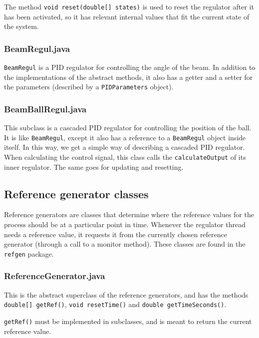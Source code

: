 The method \texttt{void reset(double[] states)} is used to reset the regulator after it has been activated, so it has relevant internal values that fit the current state of the system.

\subsubsection{BeamRegul.java}
\texttt{BeamRegul} is a PID regulator for controlling the angle of the beam. In addition to the implementations of the abstract methods, it also has a getter and a setter for the parameters (described by a \texttt{PIDParameters} object).

\subsubsection{BeamBallRegul.java}
This subclass is a cascaded PID regulator for controlling the position of the ball. It is like \texttt{BeamRegul}, except it also has a reference to a \texttt{BeamRegul} object inside itself. In this way, we get a simple way of describing a cascaded PID regulator. When calculating the control signal, this class calls the \texttt{calculateOutput} of its inner regulator. The same goes for updating and resetting.



\subsection{Reference generator classes}
Reference generators are classes that determine where the reference values for the process should be at a particular point in time. Whenever the regulator thread needs a reference value, it requests it from the currently chosen reference generator  (through a call to a monitor method). These classes are found in the \texttt{refgen} package.
 
\subsubsection{ReferenceGenerator.java}
This is the abstract superclass of the reference generators, and has the methods \texttt{double[] getRef()}, \texttt{void resetTime()} and \texttt{double getTimeSeconds()}.

\texttt{getRef()} must be implemented in subclasses, and is meant to return the current reference value.


